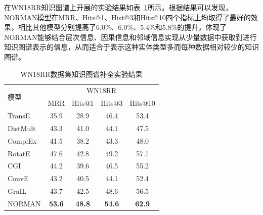 \documentclass[algorithmlist, AutoFakeBold, AutoFakeSlant, figurelist, tablelist, nomlist, masters]{seuthesix}
\begin{document}
在WN18RR知识图谱上开展的实验结果如表~\ref{Experiment1_WN18RR}所示。根据结果可以发现，NORMAN模型在MRR、Hits@1、Hist@3和Hits@10四个指标上均取得了最好的效果，相比其他模型分别提高了$6.0\%$、$6.0\%$、$5.4\%$和$5.8\%$的提升，体现了NORMAN能够结合层次信息、因果信息和邻域信息实现从少量数据中获取到进行知识图谱表示的信息，从而适合于表示这种实体类型多而每种数据相对较少的知识图谱。
\begin{table}[]
  \centering
  \begin{tabular*}{0.95\textwidth}{@{\extracolsep{\fill}}lcccc}
  \toprule[1pt]
  \multirow{2}{*}{模型} & \multicolumn{4}{c}{WN18RR} \\
    & MRR & Hits@1 & Hits@3 & Hits@10 \\ \hline
  TransE & 35.9 & 28.9 & 46.4 & 53.4 \\
  DistMult & 43.3 & 41.0 & 44.1 & 47.5 \\
  ComplEx & 41.5 & 38.2 & 43.3 & 48.0 \\
  RotatE & 47.6 & 42.8 & 49.2 & 57.1 \\
  CGI & 44.2 & 39.6 & 46.5 & 55.2 \\
  ConvE & 43.2 & 40.5 & 44.1 & 52.4 \\
  GraIL & 43.7 & 42.5 & 48.6 & 56.5 \\
  NORMAN & \textbf{53.6} & \textbf{48.8} & \textbf{54.6} & \textbf{62.9} \\
  \bottomrule[1pt]
  \end{tabular*}
  \caption{WN18RR数据集知识图谱补全实验结果}
  \label{Experiment1_WN18RR}
\end{table}
\end{document}
